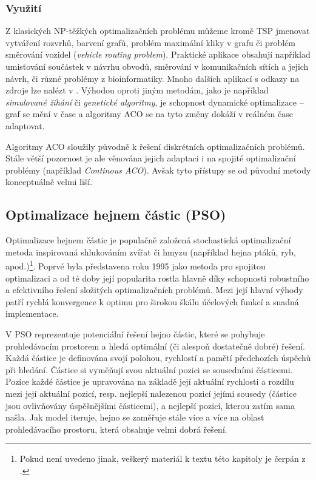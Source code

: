 \documentclass[a4paper,12pt]{article}
\begin{document}
\subsubsection{Využití}
Z klasických NP-těžkých optimalizačních problému můžeme kromě TSP jmenovat vytváření rozvrhů,
barvení grafů, problém maximální kliky v grafu či problém směrování vozidel ({\it vehicle routing problem}).
Praktické aplikace obsahují například
umisťování součástek v návrhu obvodů, směrování v komunikačních sítích a jejich návrh, či různé problémy
z bioinformatiky. Mnoho dalších aplikací s odkazy na zdroje lze nalézt v \cite{Blum08SwarmOpt}.
Výhodou oproti jiným metodám, jako je například {\it simulované žíhání} či {\it genetické algoritmy}, je
schopnost dynamické optimalizace -- graf se mění v čase a algoritmy ACO se na tyto změny dokáží v reálném
čase adaptovat.

Algoritmy ACO sloužily původně k řešení diskrétních optimalizačních problémů. Stále větší pozornost je
ale věnována jejich adaptaci i na spojité optimalizační problémy (například {\it Continous ACO}).
Avšak tyto přístupy se od původní metody konceptuálně velmi liší.


\subsection{Optimalizace hejnem částic (PSO)}
Optimalizace hejnem částic je populačně založená stochastická optimalizační metoda inspirovaná
shlukováním zvířat či hmyzu (například hejna ptáků, ryb, apod.)\footnote{Pokud není uvedeno jinak,
veškerý materiál k textu této kapitoly je čerpán z \cite{Blum08SwarmOpt}.}.
Poprvé byla představena roku 1995 jako metoda pro spojitou optimalizaci a od té doby
její popularita rostla hlavně díky schopnosti robustního a efektivního řešení složitých optimalizačních problémů.
Mezi její hlavní výhody patří rychlá konvergence k optimu pro širokou škálu účelových funkcí a snadná implementace.

V PSO reprezentuje potenciální řešení hejno částic, které se pohybuje prohledávacím prostorem a hledá
optimální (či alespoň dostatečně dobré) řešení. Každá částice je definována svojí polohou, rychlostí a pamětí
předchozích úspěchů při hledání. Částice si vyměňují svou aktuální pozici se sousedními částicemi.
Pozice každé částice je upravována na základě její aktuální rychlosti a rozdílu mezi její aktuální pozicí, resp.
nejlepší nalezenou pozicí jejími sousedy (částice jsou ovlivňovány úspěšnějšími částicemi), a nejlepší pozicí,
kterou zatím sama našla. Jak model iteruje, hejno se zaměřuje stále více a více na oblast prohledávacího
prostoru, která obsahuje velmi dobrá řešení.
\end{document}
